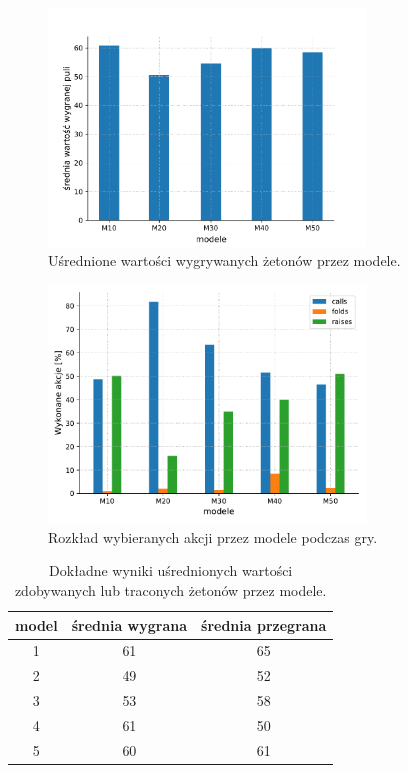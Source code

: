 \documentclass[12pt,oneside,a4paper]{report}
\begin{document}
\begin{figure}[!ht]
  \centering
  \includegraphics[width=0.75\textwidth]{./img/mecze_pw.pdf}
  \caption{Uśrednione wartości wygrywanych żetonów przez modele.}
\end{figure}


\begin{figure}[!ht]
  \centering
  \includegraphics[width=0.75\textwidth]{./img/akcje.pdf}
  \caption{Rozkład wybieranych akcji przez modele podczas gry.}
\end{figure}

\begin{table}[th!]
\centering
\caption{Dokładne wyniki uśrednionych wartości zdobywanych lub traconych żetonów przez modele.}
\begin{tabular}{|c|c|c| }
   \hline
   model & średnia wygrana & średnia przegrana \\
    \hline
   1 & 61 & 65 \\ 
   \hline
   2 & 49 & 52  \\  
   \hline
   3 & 53 & 58 \\
   \hline
   4 & 61 & 50 \\
   \hline
   5 & 60 & 61 \\
   \hline
\end{tabular}
\end{table}
\end{document}
